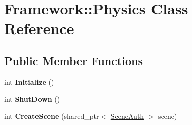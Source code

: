\hypertarget{classFramework_1_1Physics}{
\section{Framework::Physics Class Reference}
\label{classFramework_1_1Physics}
}
\subsection*{Public Member Functions}
\begin{DoxyCompactItemize}
\item 
\hypertarget{classFramework_1_1Physics_addba14e23d03c873eb98ce800aa5b393}{
int {\bfseries Initialize} ()}
\label{classFramework_1_1Physics_addba14e23d03c873eb98ce800aa5b393}

\item 
\hypertarget{classFramework_1_1Physics_a7eb5bd54bc9388d33447a8e115456295}{
int {\bfseries ShutDown} ()}
\label{classFramework_1_1Physics_a7eb5bd54bc9388d33447a8e115456295}

\item 
\hypertarget{classFramework_1_1Physics_afad24f3a6009625b752532437ac45eb4}{
int {\bfseries CreateScene} (shared\_\-ptr$<$ \hyperlink{classSceneAuth}{SceneAuth} $>$ scene)}
\label{classFramework_1_1Physics_afad24f3a6009625b752532437ac45eb4}

\end{DoxyCompactItemize}
